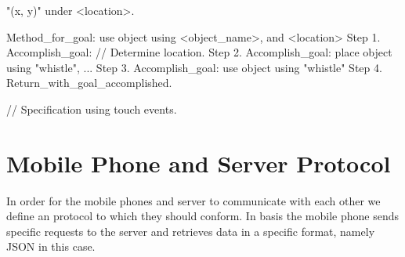 \documentclass[a4paper,11pt]{report}
\begin{document}
	"(x, y)" under <location>.
	


Method_for_goal: use object using <object_name>, and <location>
	Step 1. Accomplish_goal: // Determine location.
	Step 2. Accomplish_goal: place object using "whistle", ...
	Step 3. Accomplish_goal: use object using "whistle"
	Step 4. Return_with_goal_accomplished.

// Specification using touch events.

	\section{Mobile Phone and Server Protocol}
	In order for the mobile phones and server to communicate with each other we define an protocol to which they should conform. In basis the mobile phone sends specific requests to the server and retrieves data in a specific format, namely JSON in this case.
	
\end{document}
